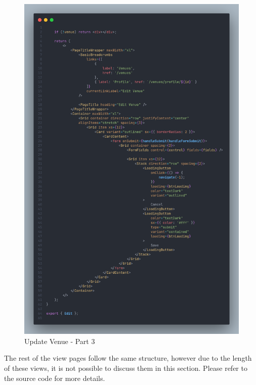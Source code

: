 \begin{justify}
\begin{itemize}
                \begin{figure}[H]
                    \centerline{\includegraphics[width=150mm,scale=1]{figures/implementation_and_testing/implementation/frontend/update_venue-3.png}}
                    \caption{Update Venue - Part 3}
                \end{figure}
            

            
        \end{itemize}

        \vspace{0.25cm}
        \newendline The rest of the view pages follow the same structure, however due to the length of these views, it is not possible to discuss them in this section. Please refer to the source code for more details.\\




\end{justify}
